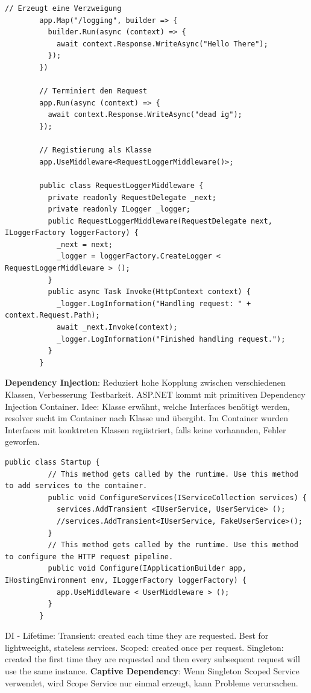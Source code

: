 \documentclass[10pt,landscape]{article}
\begin{document}
\begin{multicols}{2}
\begin{lstlisting}[style=CSharp]
        // Erzeugt eine Verzweigung
        app.Map("/logging", builder => {
          builder.Run(async (context) => {
            await context.Response.WriteAsync("Hello There");
          });
        })

        // Terminiert den Request
        app.Run(async (context) => {
          await context.Response.WriteAsync("dead ig");
        });

        // Registierung als Klasse
        app.UseMiddleware<RequestLoggerMiddleware()>;

        public class RequestLoggerMiddleware {
          private readonly RequestDelegate _next;
          private readonly ILogger _logger;
          public RequestLoggerMiddleware(RequestDelegate next, ILoggerFactory loggerFactory) {
            _next = next;
            _logger = loggerFactory.CreateLogger < RequestLoggerMiddleware > ();
          }
          public async Task Invoke(HttpContext context) {
            _logger.LogInformation("Handling request: " + context.Request.Path);
            await _next.Invoke(context);
            _logger.LogInformation("Finished handling request.");
          }
        }
        \end{lstlisting}

        \textbf{Dependency Injection}: Reduziert hohe Kopplung zwischen verschiedenen Klassen, Verbesserung Testbarkeit. ASP.NET kommt mit primitiven Dependency Injection Container.
        Idee: Klasse erwähnt, welche Interfaces benötigt werden, resolver sucht im Container nach Klasse und übergibt. Im Container wurden Interfaces mit konktreten Klassen regiistriert, falls keine vorhannden, Fehler geworfen.

        \begin{lstlisting}[style=CSharp]
        public class Startup {
          // This method gets called by the runtime. Use this method to add services to the container.
          public void ConfigureServices(IServiceCollection services) {
            services.AddTransient <IUserService, UserService> ();
            //services.AddTransient<IUserService, FakeUserService>();
          }
          // This method gets called by the runtime. Use this method to configure the HTTP request pipeline.
          public void Configure(IApplicationBuilder app, IHostingEnvironment env, ILoggerFactory loggerFactory) {
            app.UseMiddleware < UserMiddleware > ();
          }
        }
        \end{lstlisting}

        DI - Lifetime: Transient: created each time they are requested. Best for lightweeight, stateless services. Scoped: created once per request. Singleton: created the first time they are requested and then every subsequent request will use the same instance.
        \textbf{Captive Dependency}: Wenn Singleton Scoped Service verwendet, wird Scope Service nur einmal erzeugt, kann Probleme verursachen.


\end{multicols}
\end{document}
